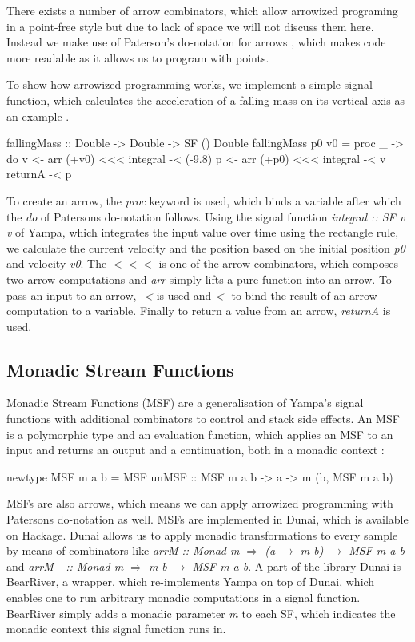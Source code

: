 There exists a number of arrow combinators, which allow arrowized programing in a point-free style but due to lack of space we will not discuss them here. Instead we make use of Paterson's do-notation for arrows \cite{paterson_new_2001}, which makes code more readable as it allows us to program with points.

To show how arrowized programming works, we implement a simple signal function, which calculates the acceleration of a falling mass on its vertical axis as an example \cite{perez_testing_2017}.

\begin{HaskellCode}
fallingMass :: Double -> Double -> SF () Double
fallingMass p0 v0 = proc _ -> do
  v <- arr (+v0) <<< integral -< (-9.8)
  p <- arr (+p0) <<< integral -< v
  returnA -< p
\end{HaskellCode}

To create an arrow, the \textit{proc} keyword is used, which binds a variable after which the \textit{do} of Patersons do-notation \cite{paterson_new_2001} follows. Using the signal function \textit{integral :: SF v v} of Yampa, which integrates the input value over time using the rectangle rule, we calculate the current velocity and the position based on the initial position \textit{p0} and velocity \textit{v0}. The $<<<$ is one of the arrow combinators, which composes two arrow computations and \textit{arr} simply lifts a pure function into an arrow. To pass an input to an arrow, \textit{-<} is used and \textit{<-} to bind the result of an arrow computation to a variable. Finally to return a value from an arrow, \textit{returnA} is used.

\subsection{Monadic Stream Functions}
\label{sec:back_msf}

Monadic Stream Functions (MSF) are a generalisation of Yampa's signal functions with additional combinators to control and stack side effects. An MSF is a polymorphic type and an evaluation function, which applies an MSF to an input and returns an output and a continuation, both in a monadic context \cite{perez_functional_2016, perez_extensible_2017}:
\begin{HaskellCode}
newtype MSF m a b = MSF {unMSF :: MSF m a b -> a -> m (b, MSF m a b)}
\end{HaskellCode}

MSFs are also arrows, which means we can apply arrowized programming with Patersons do-notation as well. MSFs are implemented in Dunai, which is available on Hackage. Dunai allows us to apply monadic transformations to every sample by means of combinators like \textit{arrM :: Monad m $\Rightarrow$ (a $\rightarrow$ m b) $\rightarrow$ MSF m a b} and \textit{arrM\_ :: Monad m $\Rightarrow$ m b $\rightarrow$ MSF m a b}. A part of the library Dunai is BearRiver, a wrapper, which re-implements Yampa on top of Dunai, which enables one to run arbitrary monadic computations in a signal function. BearRiver simply adds a monadic parameter \textit{m} to each SF, which indicates the monadic context this signal function runs in.

